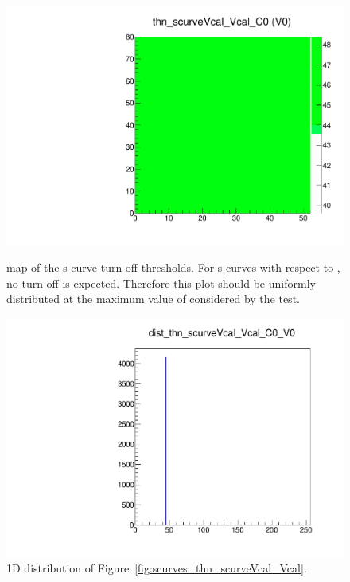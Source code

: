 \begin{figure}[!htp]
\centering
\begin{minipage}{0.45\textwidth}
  \includegraphics[width=1.0\textwidth]{figures/scurves_thn_scurveVcal_Vcal.pdf}
  \caption{\roc map of the \vcal s-curve turn-off thresholds.  
  For s-curves with respect to \vcal, no turn off is expected.
  Therefore this plot should be uniformly distributed at the maximum value of \vcal considered by the test.}
  \label{fig:scurves_thn_scurveVcal_Vcal}
\end{minipage}
\hspace{0.3cm}
\begin{minipage}{0.45\textwidth}
  \includegraphics[width=1.0\textwidth]{figures/scurves_dist_thn_scurveVcal_Vcal.pdf}
  \caption{1D distribution of Figure~\ref{fig:scurves_thn_scurveVcal_Vcal}.}
  \label{fig:scurves_dist_thn_scurveVcal_Vcal}
\end{minipage}
\end{figure}



